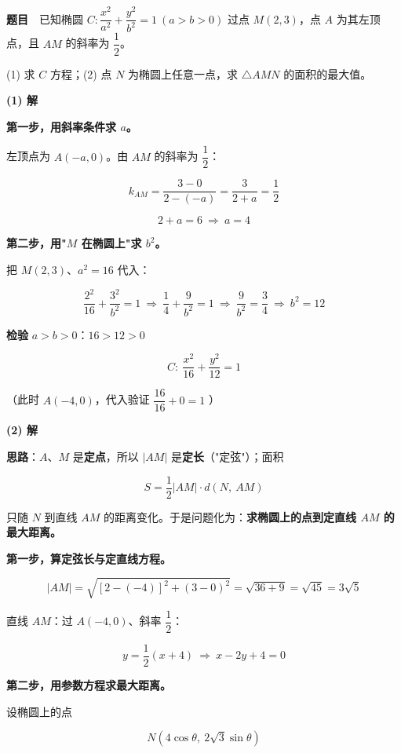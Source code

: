 \par\medskip


\textbf{题目}　已知椭圆 $C:\dfrac{x^{2}}{a^{2}}+\dfrac{y^{2}}{b^{2}}=1\ (a>b>0)$ 过点 $M(2,3)$，点 $A$ 为其左顶点，且 $AM$ 的斜率为 $\dfrac12$。

  (1) 求 $C$ 方程；(2) 点 $N$ 为椭圆上任意一点，求 $\triangle AMN$ 的面积的最大值。

\par\medskip

\textbf{(1) 解}

\textbf{第一步，用斜率条件求 $a$。}

左顶点为 $A(-a,0)$。由 $AM$ 的斜率为 $\dfrac12$：

\[k_{AM}=\frac{3-0}{2-(-a)}=\frac3{2+a}=\frac12\]

\[2+a=6\ \Longrightarrow\ a=4\]

\textbf{第二步，用"$M$ 在椭圆上"求 $b^{2}$。}

把 $M(2,3)$、$a^{2}=16$ 代入：

\[\frac{2^{2}}{16}+\frac{3^{2}}{b^{2}}=1\ \Longrightarrow\ \frac14+\frac9{b^{2}}=1\ \Longrightarrow\ \frac9{b^{2}}=\frac34\ \Longrightarrow\ b^{2}=12\]

\textbf{检验} $a>b>0$：$16>12>0$ 

\[\boxed{C:\ \frac{x^{2}}{16}+\frac{y^{2}}{12}=1}\]

（此时 $A(-4,0)$，代入验证 $\dfrac{16}{16}+0=1$ ）

\par\medskip

\textbf{(2) 解}

\textbf{思路}：$A$、$M$ 是\textbf{定点}，所以 $|AM|$ 是\textbf{定长}（"定弦"）；面积

\[S=\frac12|AM|\cdot d(N,\ AM)\]

只随 $N$ 到直线 $AM$ 的距离变化。于是问题化为：\textbf{求椭圆上的点到定直线 $AM$ 的最大距离。}

\textbf{第一步，算定弦长与定直线方程。}

\[|AM|=\sqrt{\left[2-(-4)\right]^{2}+(3-0)^{2}}=\sqrt{36+9}=\sqrt{45}=3\sqrt5\]

直线 $AM$：过 $A(-4,0)$、斜率 $\dfrac12$：

\[y=\frac12(x+4)\ \Longrightarrow\ x-2y+4=0\]

\textbf{第二步，用参数方程求最大距离。}

设椭圆上的点

\[N\left(4\cos\theta,\ 2\sqrt3\sin\theta\right)\]

